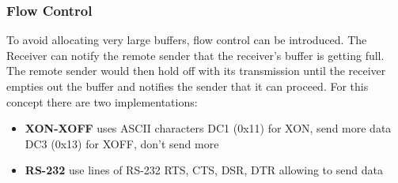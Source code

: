 \subsubsection{Flow Control}
To avoid allocating very large buffers, flow control can be introduced.
The Receiver can notify the remote sender that the receiver's buffer is getting full.
The remote sender would then hold off with its transmission until the receiver empties out the buffer and notifies the sender that it can proceed.
For this concept there are two implementations:
\begin{itemize}
	\item \textbf{XON-XOFF} uses ASCII characters
	\subitem DC1 (0x11) for XON, send more data
	\subitem DC3 (0x13) for XOFF, don't send more
	\item \textbf{RS-232} use lines of RS-232
	\subitem RTS, CTS, DSR, DTR allowing to send data
\end{itemize}
\clearpage
\pagebreak
